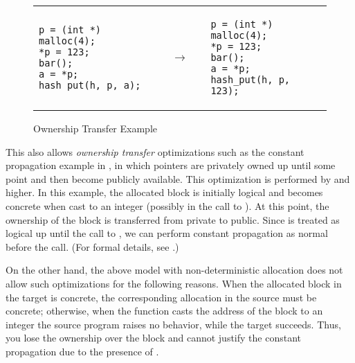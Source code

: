 \begin{figure}[t]
\small
\center
\begin{tabular}{lll}
\begin{minipage}{0.3\textwidth}
\begin{verbatim}
p = (int *) malloc(4);
*p = 123;
bar();
a = *p;
hash_put(h, p, a);
\end{verbatim}
\end{minipage}
&
$\quad\rightarrow\quad$
&
\begin{minipage}{0.3\textwidth}
\begin{verbatim}
p = (int *) malloc(4);
*p = 123;
bar();
a = *p;
hash_put(h, p, 123);
\end{verbatim}
\end{minipage}
\end{tabular}
\caption{Ownership Transfer Example}\label{fig:intptrcast:formal-semantics:ownership}
\end{figure}

This also allows \emph{ownership transfer} optimizations such as the
constant propagation example in , in which
pointers are privately owned up until some point and then become
publicly available.  
This optimization is performed by  and higher.
In this example,
the allocated block is initially logical and becomes concrete when cast to an
integer (possibly in the call to ). At this point, the ownership of the block is transferred from
private to public. Since  is treated as logical up until the
call to , we can perform constant propagation as
normal before the call. (For formal details, see .)

On the other hand, the above model with
non-deterministic allocation does not allow such optimizations for the following reasons.
When the allocated block in the target is concrete, the
  corresponding allocation in the source must be concrete; otherwise,
  when the function  casts the address of the block to
  an integer the source program raises no behavior, while the target succeeds.
Thus, you lose the ownership over the block and cannot justify the constant propagation due to the presence of .



